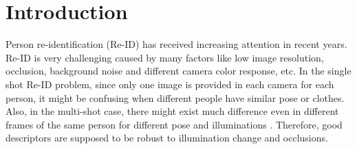 \documentclass[conference,compsoc]{IEEEtran}
\begin{document}




%
\IEEEpeerreviewmaketitle



\section{Introduction}
Person re-identification (Re-ID) has received increasing attention in recent years. Re-ID is very challenging caused by many factors like low image resolution, occlusion, background noise and different camera color response, etc. In the single shot Re-ID problem, since only one image is provided in each camera for each person, it might be confusing when different people have similar pose or clothes. Also, in the multi-shot case, there might exist much difference even in different frames of the same person for different pose and illuminations \cite{TDL}. Therefore, good descriptors are supposed to be robust to illumination change and occlusions.
\end{document}
